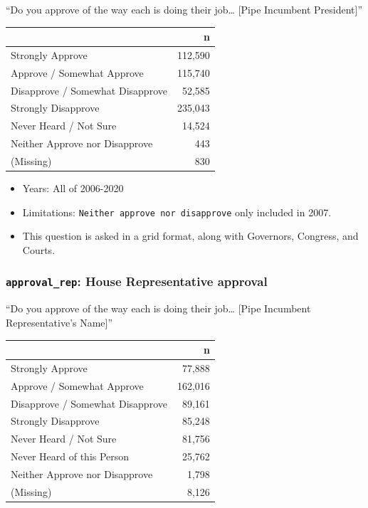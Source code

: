 \documentclass[10pt,article,oneside]{memoir}
\theoremstyle{definition}
\begin{document}
``Do you approve of the way each is doing their job\ldots{} {[}Pipe
Incumbent President{]}''

\begin{table}[H]
\centering
\begin{tabular}{lr}
\toprule
 & n\\
\midrule
Strongly Approve & 112,590\\
Approve / Somewhat Approve & 115,740\\
Disapprove / Somewhat Disapprove & 52,585\\
Strongly Disapprove & 235,043\\
Never Heard / Not Sure & 14,524\\
Neither Approve nor Disapprove & 443\\
(Missing) & 830\\
\bottomrule
\end{tabular}
\end{table}

\begin{itemize}
\tightlist
\item
  Years: All of 2006-2020
\item
  Limitations: \texttt{Neither\ approve\ nor\ disapprove} only included
  in 2007.
\item
  This question is asked in a grid format, along with Governors,
  Congress, and Courts.
\end{itemize}

\hypertarget{approval_rep-house-representative-approval}{%
\subsubsection{\texorpdfstring{\texttt{approval\_rep}: House
Representative
approval}{approval\_rep: House Representative approval}}\label{approval_rep-house-representative-approval}}

``Do you approve of the way each is doing their job\ldots{} {[}Pipe
Incumbent Representative's Name{]}''

\begin{table}[H]
\centering
\begin{tabular}{lr}
\toprule
 & n\\
\midrule
Strongly Approve & 77,888\\
Approve / Somewhat Approve & 162,016\\
Disapprove / Somewhat Disapprove & 89,161\\
Strongly Disapprove & 85,248\\
Never Heard / Not Sure & 81,756\\
Never Heard of this Person & 25,762\\
Neither Approve nor Disapprove & 1,798\\
(Missing) & 8,126\\
\bottomrule
\end{tabular}
\end{table}
\end{document}
